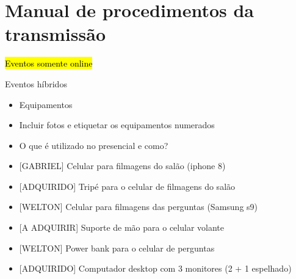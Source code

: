 \documentclass[
]{book}
\providecommand{\tightlist}{%
  \setlength{\itemsep}{0pt}\setlength{\parskip}{0pt}}
\begin{document}
\chapter{\texorpdfstring{\textbf{Manual de procedimentos da
transmissão~}}{Manual de procedimentos da transmissão~}}\label{manual-de-procedimentos-da-transmissuxe3o}

\hl{Eventos somente online}~

Eventos híbridos~

\begin{itemize}
\tightlist
\item
  Equipamentos~
\end{itemize}

\begin{itemize}
\tightlist
\item
  Incluir fotos e etiquetar os equipamentos numerados~
\end{itemize}

\begin{itemize}
\tightlist
\item
  O que é utilizado no presencial e como?~
\end{itemize}

\begin{itemize}
\tightlist
\item
  {[}GABRIEL{]} Celular para filmagens do salão (iphone 8)~
\end{itemize}

\begin{itemize}
\tightlist
\item
  {[}ADQUIRIDO{]} Tripé para o celular de filmagens do salão~
\end{itemize}

\begin{itemize}
\tightlist
\item
  {[}WELTON{]} Celular para filmagens das perguntas (Samsung s9)~
\end{itemize}

\begin{itemize}
\tightlist
\item
  {[}A ADQUIRIR{]} Suporte de mão para o celular volante~
\end{itemize}

\begin{itemize}
\tightlist
\item
  {[}WELTON{]} Power bank para o celular de perguntas~
\end{itemize}

\begin{itemize}
\tightlist
\item
  {[}ADQUIRIDO{]} Computador desktop com 3 monitores (2 + 1 espelhado)~
\end{itemize}
\end{document}
